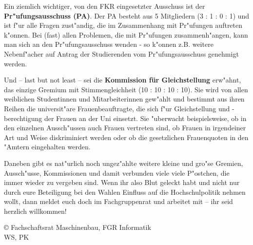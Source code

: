 Ein ziemlich wichtiger, von den FKR eingesetzter Ausschuss ist der 
\textbf{Pr"ufungsausschuss (PA)}. Der PA besteht aus 5 Mitgliedern (3 : 1 : 0 : 
1)
und ist f"ur alle Fragen zust"andig, die im Zusammenhang mit Pr"ufungen
auftreten k"onnen. Bei (fast) allen Problemen, die mit Pr"ufungen 
zusammenh"angen, kann
man sich an den Pr"ufungsausschuss wenden - so k"onnen z.B. weitere
Nebenf"acher auf Antrag der Studierenden vom Pr"ufungsausschuss genehmigt
werden. 

Und -- last but not least -- sei die \textbf{Kommission für Gleichstellung} erw"ahnt, das 
einzige Gremium mit Stimmengleichheit (10 : 10 : 10 : 10). Sie wird von allen 
weiblichen Studentinnen und Mitarbeiterinnen gew"ahlt und bestimmt aus ihren 
Reihen die universit"are Frauenbeauftragte, die sich f"ur Gleichstellung und 
-berechtigung der Frauen an der Uni einsetzt. Sie "uberwacht beispielsweise, ob 
in den einzelnen Aussch"ussen auch Frauen vertreten sind, ob Frauen in 
irgendeiner Art und Weise diskriminiert werden oder ob die gesetzlichen 
Frauenquoten in den "Amtern eingehalten werden. 

Daneben gibt es nat"urlich noch ungez"ahlte weitere kleine und gro"se Gremien, 
Aussch"usse, Kommissionen und damit verbunden viele viele P"ostchen, die immer 
wieder zu vergeben sind. Wenn ihr also Blut geleckt habt und nicht nur durch 
eure Beteiligung bei den Wahlen Einfluss auf die Hochschulpolitik nehmen wollt, 
dann meldet euch doch im Fachgruppenrat und arbeitet mit -- ihr seid herzlich 
willkommen!

{\copyright{} Fachschaftsrat Maschinenbau, FGR Informatik\\WS, PK}
